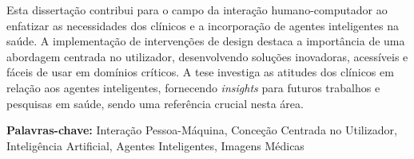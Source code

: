 Esta disserta\c{c}\~{a}o contribui para o campo da intera\c{c}\~{a}o humano-computador ao enfatizar as necessidades dos cl\'{i}nicos e a incorpora\c{c}\~{a}o de agentes inteligentes na sa\'{u}de.
A implementa\c{c}\~{a}o de interven\c{c}\~{o}es de design destaca a import\^{a}ncia de uma abordagem centrada no utilizador, desenvolvendo solu\c{c}\~{o}es inovadoras, acess\'{i}veis e f\'{a}ceis de usar em dom\'{i}nios cr\'{i}ticos.
A tese investiga as atitudes dos cl\'{i}nicos em rela\c{c}\~{a}o aos agentes inteligentes, fornecendo {\it insights} para futuros trabalhos e pesquisas em sa\'{u}de, sendo uma refer\^{e}ncia crucial nesta \'{a}rea.

\vfil

\noindent
{\bf Palavras-chave:} Interação Pessoa-Máquina, Conceção Centrada no Utilizador, Inteligência Artificial, Agentes Inteligentes, Imagens Médicas

\clearpage